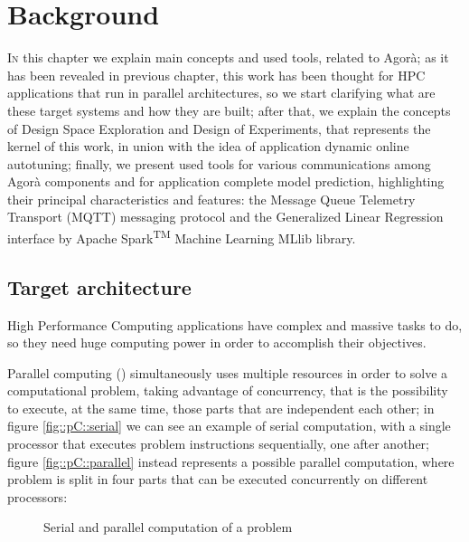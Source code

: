 \chapter{Background}\label{back}

\lettrine{I}{n} this chapter we explain main concepts and used tools, related to Agorà; as it has been revealed in previous chapter, this work has been thought for HPC applications that run in parallel architectures, so we start clarifying what are these target systems and how they are built; after that, we explain the concepts of Design Space Exploration and Design of Experiments, that represents the kernel of this work, in union with the idea of application dynamic online autotuning; finally, we present used tools for various communications among Agorà components and for application complete model prediction, highlighting their principal characteristics and features: the Message Queue Telemetry Transport (MQTT) messaging protocol and the Generalized Linear Regression interface by Apache Spark\textsuperscript{TM} Machine Learning MLlib library.

\section{Target architecture}

High Performance Computing applications have complex and massive tasks to do, so they need huge computing power in order to accomplish their objectives.

Parallel computing (\cite{barney2012introduction}) simultaneously uses multiple resources in order to solve a computational problem, taking advantage of concurrency, that is the possibility to execute, at the same time, those parts that are independent each other; in figure \ref{fig::pC::serial} we can see an example of serial computation, with a single processor that executes problem instructions sequentially, one after another; figure \ref{fig::pC::parallel} instead represents a possible parallel computation, where problem is split in four parts that can be executed concurrently on different processors:

\begin{figure}[H]

    \centering

    \quad
    
    \caption{Serial and parallel computation of a problem}

\end{figure}

